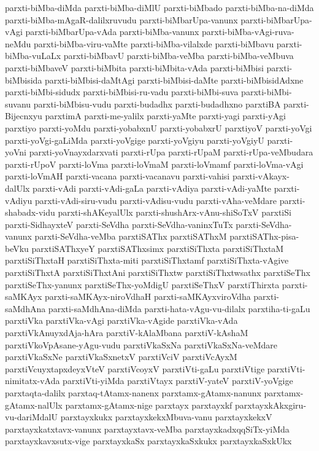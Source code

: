 {parxti-biMba-diMda
parxti-biMba-diMlU
parxti-biMbado
parxti-biMba-na-diMda
parxti-biMba-mAgaR-dalilxruvudu
parxti-biMbarUpa-vanunx
parxti-biMbarUpa-vAgi
parxti-biMbarUpa-vAda
parxti-biMba-vanunx
parxti-biMba-vAgi-ruva-neMdu
parxti-biMba-viru-vaMte
parxti-biMba-vilalxde
parxti-biMbavu
parxti-biMba-vuLaLx
parxti-biMbavU
parxti-biMba-veMba
parxti-biMba-veMbuva
parxti-biMbaveV
parxti-biMbita
parxti-biMbita-vAda
parxti-biMbisi
parxti-biMbisida
parxti-biMbisi-daMtAgi
parxti-biMbisi-daMte
parxti-biMbisidAdxne
parxti-biMbi-sidudx
parxti-biMbisi-ru-vadu
parxti-biMbi-suva
parxti-biMbi-suvanu
parxti-biMbisu-vudu
parxti-budadhx
parxti-budadhxno
parxtiBA
parxti-Bijecnxyu
parxtimA
parxti-me-yalilx
parxti-yaMte
parxti-yagi
parxti-yAgi
parxtiyo
parxti-yoMdu
parxti-yobabxnU
parxti-yobabxrU
parxtiyoV
parxti-yoVgi
parxti-yoVgi-gaLiMda
parxti-yoVgige
parxti-yoVgiyu
parxti-yoVgiyU
parxti-yoVni
parxti-yoVnayxdarxvati
parxti-rUpa
parxti-rUpaM
parxti-rUpa-veMbudara
parxti-rUpoV
parxti-loVma
parxti-loVmaM
parxti-loVmamf
parxti-loVma-vAgi
parxti-loVmAH
parxti-vacana
parxti-vacanavu
parxti-vahisi
parxti-vAkayx-dalUlx
parxti-vAdi
parxti-vAdi-gaLa
parxti-vAdiya
parxti-vAdi-yaMte
parxti-vAdiyu
parxti-vAdi-siru-vudu
parxti-vAdisu-vudu
parxti-vAha-veMdare
parxti-shabadx-vidu
parxti-shAKeyalUlx
parxti-shushArx-vAnu-shiSoTxV
parxtiSi
parxti-SidhayxteV
parxti-SeVdha
parxti-SeVdha-vaninxTuTx
parxti-SeVdha-vanunx
parxti-SeVdha-veMba
parxtiSAThx
parxtiSAThxM
parxtiSAThx-pisa-beVku
parxtiSAThxyeY
parxtiSAThxsimx
parxtiSiThxta
parxtiSiThxtaM
parxtiSiThxtaH
parxtiSiThxta-miti
parxtiSiThxtamf
parxtiSiThxta-vAgive
parxtiSiThxtA
parxtiSiThxtAni
parxtiSiThxtw
parxtiSiThxtwsathx
parxtiSeThx
parxtiSeThx-yanunx
parxtiSeThx-yoMdigU
parxtiSeThxV
parxtiThirxta
parxti-saMKAyx
parxti-saMKAyx-niroVdhaH
parxti-saMKAyxviroVdha
parxti-saMdhAna
parxti-saMdhAna-diMda
parxti-hata-vAgu-vu-dilalx
parxtiha-ti-gaLu
parxtiVka
parxtiVka-vAgi
parxtiVka-vAgide
parxtiVka-vAda
parxtiVkAnuyxdAja-hAra
parxtiV-kAlaMbana
parxtiV-kAshaM
parxtiVkoVpAsane-yAgu-vudu
parxtiVkaSxNa
parxtiVkaSxNa-veMdare
parxtiVkaSxNe
parxtiVkaSxnetxV
parxtiVciV
parxtiVcAyxM
parxtiVcuyxtapxdeyxVteV
parxtiVcoyxV
parxtiVti-gaLu
parxtiVtige
parxtiVti-nimitatx-vAda
parxtiVti-yiMda
parxtiVtayx
parxtiV-yateV
parxtiV-yoVgige
parxtaqta-dalilx
parxtaq-tAtamx-nanenx
parxtamx-gAtamx-nanunx
parxtamx-gAtamx-nalUlx
parxtamx-gAtamx-nige
parxtayx
parxtayxkf
parxtayxkAkxgiru-vu-dariMdalU
parxtayxkukx
parxtayxkekxMbuva-vanu
parxtayxkekxV
parxtayxkatxtavx-vanunx
parxtayxtavx-veMba
parxtayxkadxqqSiTx-yiMda
parxtayxkavxsutx-vige
parxtayxkaSx
parxtayxkaSxkukx
parxtayxkaSxkUkx
}
